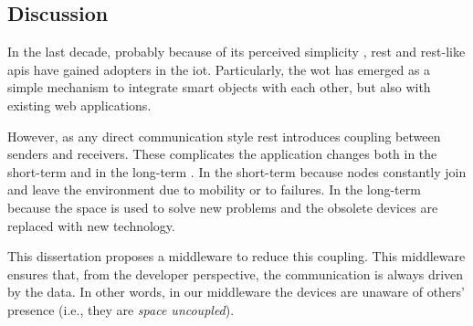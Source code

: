 \subsection{Discussion}


In the last decade, probably because of its perceived simplicity \citep{guinard_search_2011}, \ac{rest} and \ac{rest}-like \acp{api} have gained adopters in the \ac{iot}.
Particularly, the \ac{wot} has emerged as a simple mechanism to integrate smart objects with each other, but also with existing web applications.

However, as any direct communication style \ac{rest} introduces coupling between senders and receivers.
These complicates the application changes both in the short-term and in the long-term \citep{johanson_extending_2004}.
In the short-term because nodes constantly join and leave the environment due to mobility or to failures.
In the long-term because the space is used to solve new problems and the obsolete devices are replaced with new technology.

This dissertation proposes a middleware to reduce this coupling.
This middleware ensures that, from the developer perspective, the communication is always driven by the data.
In other words, in our middleware the devices are unaware of others' presence (i.e., they are \emph{space uncoupled}).
